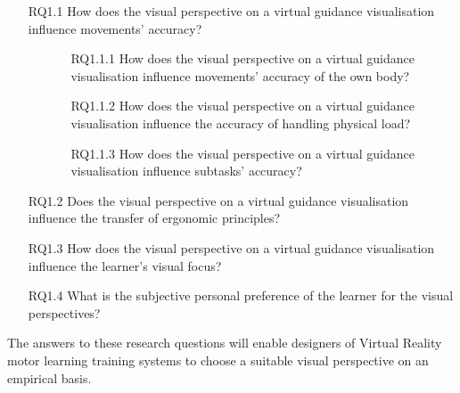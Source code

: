 \begin{enumerate}[align=left, leftmargin=0pt, labelindent=\parindent,
	listparindent=\parindent, labelwidth=0pt, itemindent=!]
	\item[RQ1.1] How does the visual perspective on a virtual guidance visualisation influence movements' accuracy?
	\begin{itemize}
		\item[] \begin{itemize}
			\item[RQ1.1.1] How does the visual perspective on a virtual guidance visualisation influence movements' accuracy of the own body?
			\item[RQ1.1.2] How does the visual perspective on a virtual guidance visualisation influence the accuracy of handling physical load?
			\item[RQ1.1.3] How does the visual perspective on a virtual guidance visualisation influence subtasks' accuracy?
		\end{itemize}
	\end{itemize}
	
	\item[RQ1.2] Does the visual perspective on a virtual guidance visualisation influence the transfer of ergonomic principles?
	\item[RQ1.3] How does the visual perspective on a virtual guidance visualisation influence the learner's visual focus?
	\item[RQ1.4] What is the subjective personal preference of the learner for the visual perspectives?
\end{enumerate}
The answers to these research questions will enable designers of Virtual Reality motor learning training systems to choose a suitable visual perspective on an empirical basis.

